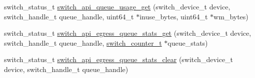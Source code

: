 \begin{DoxyCompactItemize}
\item 
switch\+\_\+status\+\_\+t \hyperlink{group__QUEUE_ga8123f74c030ca6de8446a4e52cfd60f3}{switch\+\_\+api\+\_\+queue\+\_\+usage\+\_\+get} (switch\+\_\+device\+\_\+t device, switch\+\_\+handle\+\_\+t queue\+\_\+handle, uint64\+\_\+t $\ast$inuse\+\_\+bytes, uint64\+\_\+t $\ast$wm\+\_\+bytes)
\item 
switch\+\_\+status\+\_\+t \hyperlink{group__QUEUE_gaaa86eccefa1ece78eb273b1b0d9913ac}{switch\+\_\+api\+\_\+egress\+\_\+queue\+\_\+stats\+\_\+get} (switch\+\_\+device\+\_\+t device, switch\+\_\+handle\+\_\+t queue\+\_\+handle, \hyperlink{structswitch__counter__s}{switch\+\_\+counter\+\_\+t} $\ast$queue\+\_\+stats)
\item 
switch\+\_\+status\+\_\+t \hyperlink{group__QUEUE_ga9a8bc5eb6448614218f04188e8002b3d}{switch\+\_\+api\+\_\+egress\+\_\+queue\+\_\+stats\+\_\+clear} (switch\+\_\+device\+\_\+t device, switch\+\_\+handle\+\_\+t queue\+\_\+handle)
\end{DoxyCompactItemize}



